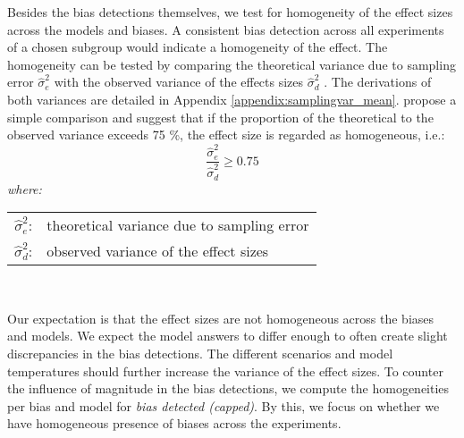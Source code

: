 \par Besides the bias detections themselves, we test for homogeneity of the effect sizes across the models and biases. A consistent bias detection across all experiments of a chosen subgroup would indicate a homogeneity of the effect. The homogeneity can be tested by comparing the theoretical variance due to sampling error $\hat{\sigma}^2_{e}$ with the observed variance of the effects sizes $\hat{\sigma}^2_{d}$ \parencite{borenstein2021introduction, morris2002combining}. The derivations of both variances are detailed in Appendix \ref{appendix:samplingvar_mean}. \textcite{hunter2004methods} propose a simple comparison and suggest that if the proportion of the theoretical to the observed variance exceeds 75 \%, the effect size is regarded as homogeneous, i.e.:
\begin{equation} \label{eq:homogeneity}
    \frac{\hat{\sigma}^2_{e}}{\hat{\sigma}^2_{d}} \geq 0.75
\end{equation}
\hspace{0.5cm} \textit{where:} \\
\hspace*{3em}
\begin{tabular}{rl}
    $\hat{\sigma}^2_{e}$:& theoretical variance due to sampling error \\
    $\hat{\sigma}^2_{d}$:& observed variance of the effect sizes \\
\end{tabular} \\

\par Our expectation is that the effect sizes are not homogeneous across the biases and models. We expect the model answers to differ enough to often create slight discrepancies in the bias detections. The different scenarios and model temperatures should further increase the variance of the effect sizes. To counter the influence of magnitude in the bias detections, we compute the homogeneities per bias and model for \textit{bias detected (capped)}. By this, we focus on whether we have homogeneous presence of biases across the experiments.

